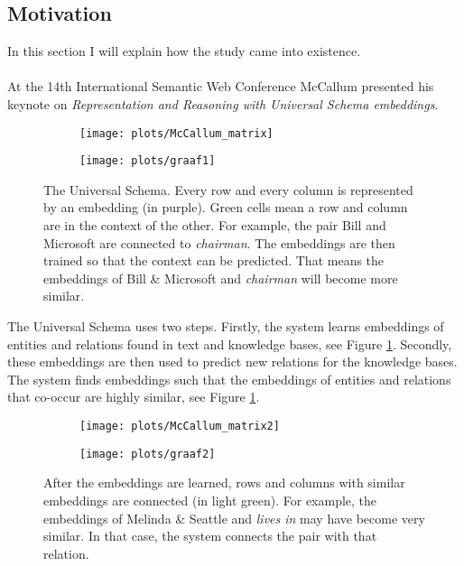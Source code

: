 \documentclass{article}
\begin{document}
 \subsection{Motivation}
 In this section I will explain how the study came into existence.
 \paragraph{}
 At the 14th International Semantic Web Conference McCallum presented his keynote on \emph{Representation and Reasoning with Universal Schema embeddings}\cite{mccallumweblecture}. 
 
 \begin{figure}[H]
 \centering
 \begin{subfigure}{.475\textwidth}
 \texttt{[image: plots/McCallum\_matrix]}
 \end{subfigure}
 \begin{subfigure}{0.475\textwidth}
 \texttt{[image: plots/graaf1]}
 \end{subfigure}
 \caption[Universal Schema]{The Universal Schema. Every row and every column is represented by an embedding (in purple). Green cells mean a row and column are in the context of the other. For example, the pair Bill and Microsoft are connected to \emph{chairman}.
 The embeddings are then trained so that the context can be predicted. That means the embeddings of Bill \& Microsoft and \emph{chairman} will become more similar.}
 \label{McCallum_matrix}
 \end{figure}

The Universal Schema uses two steps. Firstly, the system learns embeddings of entities and relations found in text and knowledge bases\cite{universalschema}, see Figure \ref{McCallum_matrix}. Secondly, these embeddings are then used to predict new relations for the knowledge bases. The system finds embeddings such that the embeddings of entities and relations that co-occur are highly similar, see Figure \ref{McCallum_matrix}.

 \begin{figure}[H]
 \centering
 \begin{subfigure}{0.475\textwidth}
 \texttt{[image: plots/McCallum\_matrix2]}
 \end{subfigure}
 \begin{subfigure}{0.475\textwidth}
 \texttt{[image: plots/graaf2]}
 \end{subfigure}
 \caption[Universal Schema predictions]{After the embeddings are learned, rows and columns with similar embeddings are connected (in light green).
 For example, the embeddings of Melinda \& Seattle and \emph{lives in} may have become very similar. In that case, the system connects the pair with that relation.}
 \label{McCallum_matrix2}
 \end{figure}
 
\end{document}
